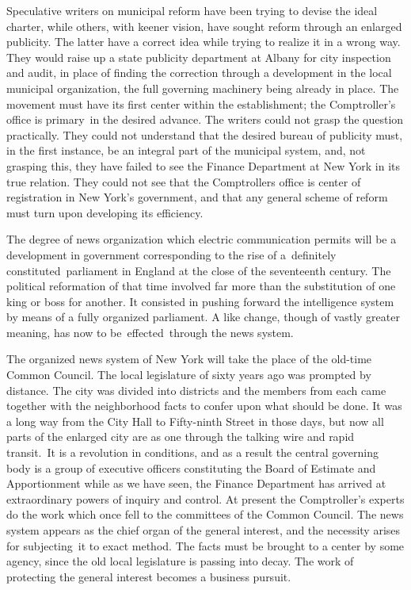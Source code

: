 \documentclass[twoside,symmetric,nobib,justified]{tufte-book}
\begin{document}
Speculative writers on municipal reform have been trying to devise the
ideal charter, while others, with keener vision, have sought reform
through an enlarged publicity. The latter have a correct idea while
trying to realize it in a wrong way. They would raise up a state
publicity department at Albany for city inspection and audit, in place
of finding the correction through a development in the local municipal
organization, the full governing machinery being already in place. The
movement must have its first center within the establishment; the
Comptroller's office is primary~in the desired advance. The writers
could not grasp the question practically. They could not understand that
the desired bureau of publicity must, in the first instance, be an
integral part of the municipal system, and, not grasping this, they have
failed to see the Finance Department at New York in its true relation.
They could not see that the Comptroller\textquotesingle s office is
center of registration in New York's government, and that any general
scheme of reform must turn upon developing its efficiency.~

The degree of news organization which electric communication permits
will be a development in government corresponding to the rise of
a~definitely constituted~parliament in England at the close of the
seventeenth century. The political reformation of that time involved far
more than the substitution of one king or boss for another. It consisted
in pushing forward the intelligence system by means of a fully organized
parliament. A like change, though of vastly greater meaning, has now to
be~effected~through the news system.~

The organized news system of New York will take the place of the
old-time Common Council. The local legislature of sixty years ago was
prompted by distance. The city was divided into districts and the
members from each came together with the neighborhood facts to confer
upon what should be done. It was a long way from the City Hall to
Fifty-ninth Street in those days, but now all parts of the enlarged city
are as one through the talking wire and rapid transit.~It is a
revolution in conditions, and as a result the central governing body is
a group of executive officers constituting the Board of Estimate and
Apportionment while as we have seen, the Finance Department has arrived
at extraordinary powers of inquiry and control. At present the
Comptroller's experts do the work which once fell to the committees of
the Common Council. The news system appears as the chief organ of the
general interest, and the necessity arises for subjecting~it to exact
method. The facts must be brought to a center by some agency, since the
old local legislature is passing into decay. The work of protecting the
general interest becomes a business pursuit.~
\end{document}

